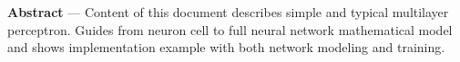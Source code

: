 \begin{center}

\label{abstract}
\textbf{Abstract} --- 
Content of this document describes simple and typical multilayer perceptron.
Guides from neuron cell to full neural network mathematical model and
shows implementation example with both network modeling and training.

\end{center}

